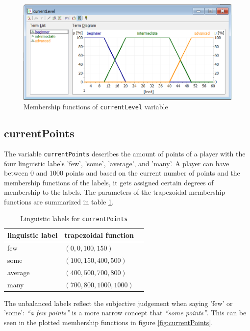 \begin{figure}[H]
\centering
\includegraphics[width=\textwidth]{img/vCurrentLevel}
\caption{Membership functions of \texttt{currentLevel} variable}
\label{fig:currentLevel} 
\end{figure}

\subsection{currentPoints}

The variable \texttt{currentPoints} describes the amount of points of a player with the four linguistic labels 'few', 'some', 'average', and 'many'. A player can have between 0 and 1000 points and based on the current number of points and the membership functions of the labels, it gets assigned certain degrees of membership to the labels. The parameters of the trapezoidal membership functions are summarized in table \ref{tab:currentPoints}.

\begin{table}[H]
\centering
\begin{tabular}{@{}lll@{}}
\toprule
\textbf{linguistic label}  & \textbf{trapezoidal function} \\ 
\midrule
few  & $(0,0,100,150)$ \\
some & $(100,150,400,500)$ \\
average & $(400,500,700,800)$ \\
many & $(700,800,1000,1000)$ \\
\bottomrule
\end{tabular}
\caption{Linguistic labels for \texttt{currentPoints}}
\label{tab:currentPoints}
\end{table}

The unbalanced labels reflect the subjective judgement when saying 'few' or 'some': \textit{``a few points''} is a more narrow concept that \textit{``some points''}. This can be seen in the plotted membership functions in figure \ref{fig:currentPoints}. 

